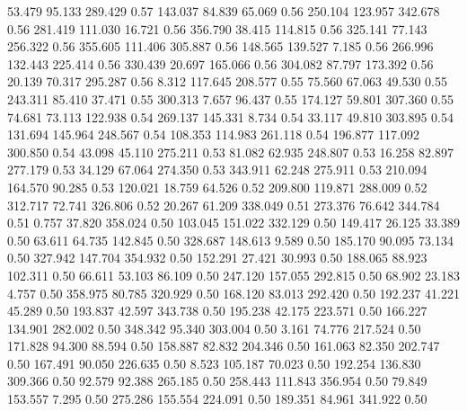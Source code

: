   53.479   95.133  289.429         0.57
 143.037   84.839   65.069         0.56
 250.104  123.957  342.678         0.56
 281.419  111.030   16.721         0.56
 356.790   38.415  114.815         0.56
 325.141   77.143  256.322         0.56
 355.605  111.406  305.887         0.56
 148.565  139.527    7.185         0.56
 266.996  132.443  225.414         0.56
 330.439   20.697  165.066         0.56
 304.082   87.797  173.392         0.56
  20.139   70.317  295.287         0.56
   8.312  117.645  208.577         0.55
  75.560   67.063   49.530         0.55
 243.311   85.410   37.471         0.55
 300.313    7.657   96.437         0.55
 174.127   59.801  307.360         0.55
  74.681   73.113  122.938         0.54
 269.137  145.331    8.734         0.54
  33.117   49.810  303.895         0.54
 131.694  145.964  248.567         0.54
 108.353  114.983  261.118         0.54
 196.877  117.092  300.850         0.54
  43.098   45.110  275.211         0.53
  81.082   62.935  248.807         0.53
  16.258   82.897  277.179         0.53
  34.129   67.064  274.350         0.53
 343.911   62.248  275.911         0.53
 210.094  164.570   90.285         0.53
 120.021   18.759   64.526         0.52
 209.800  119.871  288.009         0.52
 312.717   72.741  326.806         0.52
  20.267   61.209  338.049         0.51
 273.376   76.642  344.784         0.51
   0.757   37.820  358.024         0.50
 103.045  151.022  332.129         0.50
 149.417   26.125   33.389         0.50
  63.611   64.735  142.845         0.50
 328.687  148.613    9.589         0.50
 185.170   90.095   73.134         0.50
 327.942  147.704  354.932         0.50
 152.291   27.421   30.993         0.50
 188.065   88.923  102.311         0.50
  66.611   53.103   86.109         0.50
 247.120  157.055  292.815         0.50
  68.902   23.183    4.757         0.50
 358.975   80.785  320.929         0.50
 168.120   83.013  292.420         0.50
 192.237   41.221   45.289         0.50
 193.837   42.597  343.738         0.50
 195.238   42.175  223.571         0.50
 166.227  134.901  282.002         0.50
 348.342   95.340  303.004         0.50
   3.161   74.776  217.524         0.50
 171.828   94.300   88.594         0.50
 158.887   82.832  204.346         0.50
 161.063   82.350  202.747         0.50
 167.491   90.050  226.635         0.50
   8.523  105.187   70.023         0.50
 192.254  136.830  309.366         0.50
  92.579   92.388  265.185         0.50
 258.443  111.843  356.954         0.50
  79.849  153.557    7.295         0.50
 275.286  155.554  224.091         0.50
 189.351   84.961  341.922         0.50
